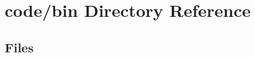 \section{code/bin Directory Reference}
\label{dir_574ed011996fab32bdab656ff9b0f6b0}
\subsection*{Files}
\begin{DoxyCompactItemize}
\end{DoxyCompactItemize}
